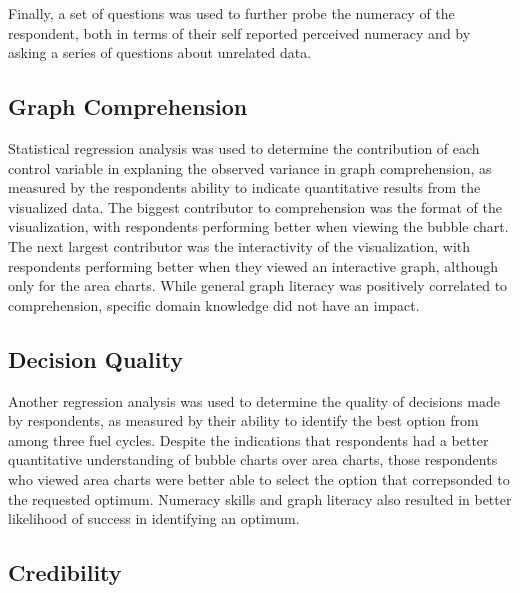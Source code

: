 Finally, a set of questions was used to further probe the numeracy of the
respondent, both in terms of their self reported perceived numeracy and by
asking a series of questions about unrelated data.

\subsection{Graph Comprehension}

Statistical regression analysis was used to determine the contribution of each
control variable in explaning the observed variance in graph comprehension, as
measured by the respondents ability to indicate quantitative results from the
visualized data.  The biggest contributor to comprehension was the format of
the visualization, with respondents performing better when viewing the bubble
chart.  The next largest contributor was the interactivity of the
visualization, with respondents performing better when they viewed an
interactive graph, although only for the area charts.  While general graph
literacy was positively correlated to comprehension, specific domain knowledge
did not have an impact.

\subsection{Decision Quality}

Another regression analysis was used to determine the quality of decisions
made by respondents, as measured by their ability to identify the best option
from among three fuel cycles.  Despite the indications that respondents had a
better quantitative understanding of bubble charts over area charts, those
respondents who viewed area charts were better able to select the option that
correpsonded to the requested optimum.  Numeracy skills and graph literacy
also resulted in better likelihood of success in identifying an optimum.

\subsection{Credibility}

